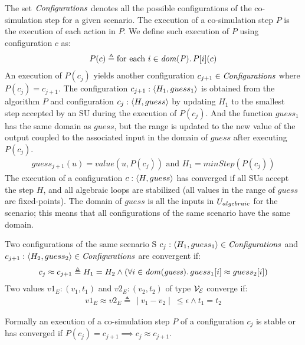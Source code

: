 The set $\mathit{Configurations}$ denotes all the possible configurations of the co-simulation step for a given scenario. The execution of a co-simulation step $P$ is the execution of each action in $P$. We define such execution of $P$ using configuration $c$ as:
\vspace{-1em}
\begin{align}
  P(c) \triangleq \text{for each } i \in \mathit{dom(P)} \ldotp P[i](c)
\end{align}
An execution of $P(c_j)$ yields another configuration $c_{j+1} \in \mathit{Configurations}$ where $P(c_j) = c_{j+1}$. The configuration $c_{j+1}:  \left\langle H_1, guess_1 \right\rangle $ is obtained from the algorithm $P$ and configuration $c_j:  \left\langle H, guess \right\rangle $ by updating $H_1$ to the smallest step accepted by an SU during the execution of $P(c_j)$. And the function $guess_1$ has the same domain as $guess$, but the range is updated to the new value of the output coupled to the associated input in the domain of $guess$ after executing $P(c_j)$.
\vspace{-1em}
\begin{align}
  guess_{j+1}(u) = value(u,P(c_j)) \text{ and } H_1 = minStep(P(c_j))  
\end{align}  
The execution of a configuration $c:  \left\langle H, guess \right\rangle $ has converged if all SUs accept the step $H$, and all algebraic loops are stabilized (all values in the range of $guess$ are fixed-points). 
The domain of $guess$ is all the inputs in $U_{algebraic}$ for the scenario; this means that all configurations of the same scenario have the same domain.
\begin{definition}\label{def:convergent}
  Two configurations of the same scenario S $c_j: \left\langle H_1,guess_1 \right\rangle  \in \mathit{Configurations}$ and $c_{j+1}:  \left\langle H_2, guess_2 \right\rangle  \in \mathit{Configurations}$ are convergent if:
  \vspace{-1em}
  \begin{align*}
    c_j \approx c_{j+1} \triangleq H_1 = H_2 \land (\forall i \in \mathit{dom(guess)} \ldotp guess_1[i] \approx guess_2[i])
  \end{align*}
  Two values $v1_E: (v_1, t_1)$ and $v2_E: (v_2, t_2)$ of type $\mathcal{V_{E}}$ converge if:
  \begin{align}
    v1_E \approx v2_E \triangleq \, \mid v_1 - v_2 \mid \ \leq \epsilon \land t_1 = t_2
  \end{align}
\end{definition}

Formally an execution of a co-simulation step $P$ of a configuration $c_j$ is stable or has converged if $P(c_j) = c_{j+1} \implies c_j \approx c_{j+1}$.

